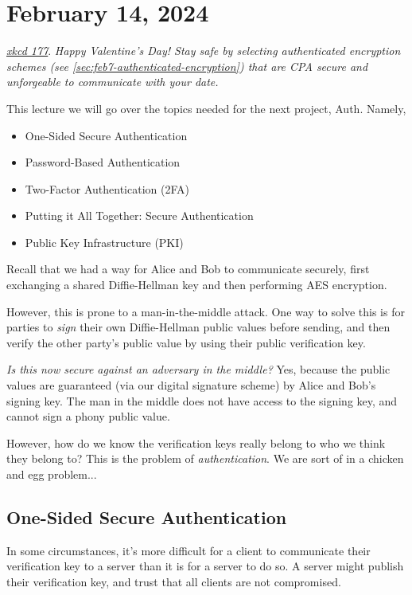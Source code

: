 \section{February 14, 2024}
\label{20240214}

\begin{center}
    \href{https://xkcd.com/177/}{\emph{xkcd 177}}. \emph{Happy Valentine's Day! Stay safe by selecting authenticated encryption schemes (see \cref{sec:feb7-authenticated-encryption}) that are CPA secure and unforgeable to communicate with your date.}
\end{center}

This lecture we will go over the topics needed for the next project, Auth. Namely,
\begin{itemize}
    \item One-Sided Secure Authentication
    \item Password-Based Authentication
    \item Two-Factor Authentication (2FA)
    \item Putting it All Together: Secure Authentication
    \item Public Key Infrastructure (PKI)
\end{itemize}

Recall that we had a way for Alice and Bob to communicate securely, first exchanging a shared Diffie-Hellman key and then performing AES encryption.


However, this is prone to a man-in-the-middle attack. One way to solve this is for parties to \emph{sign} their own Diffie-Hellman public values before sending, and then verify the other party's public value by using their public verification key.


\emph{Is this now secure against an adversary in the middle?} Yes, because the public values are guaranteed (via our digital signature scheme) by Alice and Bob's signing key. The man in the middle does not have access to the signing key, and cannot sign a phony public value.

However, how do we know the verification keys really belong to who we think they belong to? This is the problem of \emph{authentication}. We are sort of in a chicken and egg problem...

\subsection{One-Sided Secure Authentication}
In some circumstances, it's more difficult for a client to communicate their verification key to a server than it is for a server to do so. A server might publish their verification key, and trust that all clients are not compromised.

